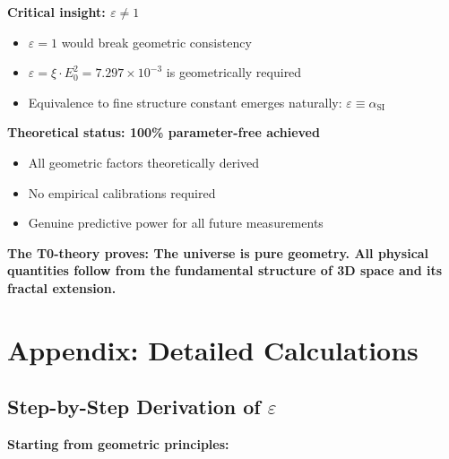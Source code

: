 \documentclass[12pt,a4paper]{article}
\numberwithin{equation}{section}
\newcommand{\xipar}{\xi}
\newcommand{\epsilonT}{\varepsilon}
\newcommand{\alphaSI}{\alpha_{\text{SI}}}
\newcommand{\Eo}{E_0}
\begin{document}
	\textbf{Critical insight: $\epsilonT \neq 1$}
	\begin{itemize}
		\item $\epsilonT = 1$ would break geometric consistency
		\item $\epsilonT = \xipar \cdot \Eo^2 = 7.297 \times 10^{-3}$ is geometrically required
		\item Equivalence to fine structure constant emerges naturally: $\epsilonT \equiv \alphaSI$
	\end{itemize}
	
	\textbf{Theoretical status: 100\% parameter-free achieved}
	\begin{itemize}
		\item All geometric factors theoretically derived
		\item No empirical calibrations required
		\item Genuine predictive power for all future measurements
	\end{itemize}
	
	\textbf{The T0-theory proves: The universe is pure geometry. All physical quantities follow from the fundamental structure of 3D space and its fractal extension.}
	
	
	\section{Appendix: Detailed Calculations}
	
	\subsection{Step-by-Step Derivation of $\epsilonT$}
	
	\textbf{Starting from geometric principles:}
	
\end{document}
